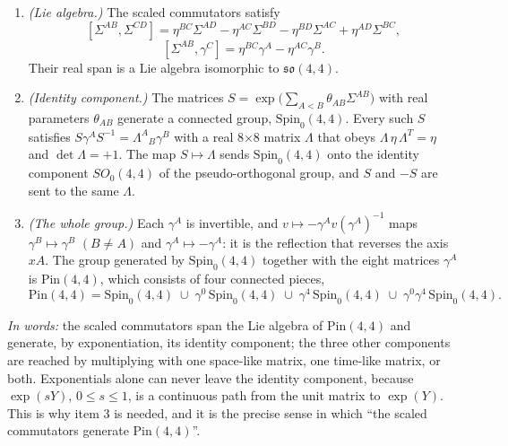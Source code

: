 \documentclass[
  10pt,
]{article}
\providecommand{\tightlist}{%
  \setlength{\itemsep}{0pt}\setlength{\parskip}{0pt}}
\begin{document}
\begin{enumerate}
\def\labelenumi{\arabic{enumi}.}
\tightlist
\item
  \emph{(Lie algebra.)} The scaled commutators satisfy
  \[[\Sigma^{AB},\Sigma^{CD}]=\eta^{BC}\Sigma^{AD}-\eta^{AC}\Sigma^{BD}-\eta^{BD}\Sigma^{AC}+\eta^{AD}\Sigma^{BC},\tag{1.5}\]
  \[[\Sigma^{AB},\gamma^{C}]=\eta^{BC}\gamma^{A}-\eta^{AC}\gamma^{B}.\tag{1.6}\]
  Their real span is a Lie algebra isomorphic to \(\mathfrak{so}(4,4)\).
\item
  \emph{(Identity component.)} The matrices
  \(S=\exp\!\big(\sum_{A<B}\theta_{AB}\Sigma^{AB}\big)\) with real
  parameters \(\theta_{AB}\) generate a connected group,
  \(\mathrm{Spin}_0(4,4)\). Every such \(S\) satisfies
  \(S\gamma^AS^{-1}=\Lambda^A{}_B\gamma^B\) with a real 8×8 matrix
  \(\Lambda\) that obeys \(\Lambda\,\eta\,\Lambda^T=\eta\) and
  \(\det\Lambda=+1\). The map \(S\mapsto\Lambda\) sends
  \(\mathrm{Spin}_0(4,4)\) onto the identity component \(SO_0(4,4)\) of
  the pseudo-orthogonal group, and \(S\) and \(-S\) are sent to the same
  \(\Lambda\).
\item
  \emph{(The whole group.)} Each \(\gamma^A\) is invertible, and
  \(v\mapsto-\gamma^Av(\gamma^A)^{-1}\) maps \(\gamma^B\mapsto\gamma^B\)
  \((B\neq A)\) and \(\gamma^A\mapsto-\gamma^A\): it is the reflection
  that reverses the axis \(xA\). The group generated by
  \(\mathrm{Spin}_0(4,4)\) together with the eight matrices \(\gamma^A\)
  is \(\mathrm{Pin}(4,4)\), which consists of four connected pieces,
  \[\mathrm{Pin}(4,4)=\mathrm{Spin}_0(4,4)\;\cup\;\gamma^0\,\mathrm{Spin}_0(4,4)\;\cup\;\gamma^4\,\mathrm{Spin}_0(4,4)\;\cup\;\gamma^0\gamma^4\,\mathrm{Spin}_0(4,4) .\]
\end{enumerate}

\emph{In words:} the scaled commutators span the Lie algebra of
\(\mathrm{Pin}(4,4)\) and generate, by exponentiation, its identity
component; the three other components are reached by multiplying with
one space-like matrix, one time-like matrix, or both. Exponentials alone
can never leave the identity component, because \(\exp(sY)\),
\(0\le s\le1\), is a continuous path from the unit matrix to
\(\exp(Y)\). This is why item 3 is needed, and it is the precise sense
in which ``the scaled commutators generate \(\mathrm{Pin}(4,4)\)''.
\end{document}
